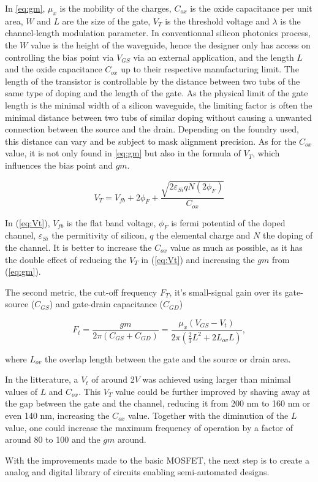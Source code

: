In \ref{eq:gm}, $\mu_x$ is the mobility of the charges, $C_{ox}$ is the oxide capacitance per unit area, $W$ and $L$ are the size of the gate, $V_T$ is the threshold voltage and $\lambda$ is the channel-length modulation parameter. 
In  conventionnal silicon photonics process, the $W$ value is the height of the waveguide, hence the designer only has access on controlling the bias point via  $V_{GS}$ via an external application, and the length $L$ and the oxide capacitance $C_{ox}$ up to their respective manufacturing limit.
The length of the transistor is controllable by the distance between two tubs of the same type of doping and the length of the gate.
As the physical limit of the gate length is the minimal width of a silicon waveguide, the limiting factor is often the minimal distance between two tubs of similar doping without causing a unwanted connection between the source and the drain.
Depending on the foundry used, this distance can vary and be subject to mask alignment precision. 
As for the $C_{ox}$ value, it is not only found in \ref{eq:gm} but also in the formula of $V_T$, which influences the bias point and $gm$.

\begin{equation}
\label{eq:Vt}
V_T = V_{fb} + 2\phi_F + \frac{\sqrt{2\varepsilon_{Si} qN(2\phi_F)}}{C_{ox}}
\end{equation}

In (\ref{eq:Vt}), $V_{fb}$ is the flat band voltage,  $\phi_F$ is fermi potential of the doped channel, $\varepsilon_{Si}$ the permitivity of silicon, $q$ the elemental charge and $N$ the doping of the channel.
It is better to increase the $C_{ox}$ value as much as possible, as it has the double effect of reducing the $V_T$ in (\ref{eq:Vt}) and increasing the $gm$ from (\ref{eq:gm}).

The second metric, the cut-off frequency $F_T$, it's small-signal gain over its gate-source ($C_{GS}$) and gate-drain capacitance ($C_{GD}$) %

\begin{equation}
\label{eq:Ft}
F_t = \frac{gm}{2\pi(C_{GS}+C_{GD})} = \frac{\mu_x(V_{GS}-V_t)}{2\pi (\frac{2}{3}L^2+2L_{ov}L)},
\end{equation}

where $L_{ov}$ the overlap length between the gate and the source or drain area.

In the litterature, a $V_t$ of around 2$V$ was achieved using larger than minimal values of $L$ and $C_{ox}$\CitationNeeded. 
This $V_T$ value could be further improved by shaving away at the gap between the gate and the channel, reducing it from 200 nm to 160 nm or even 140 nm, increasing the $C_{ox}$ value. 
Together with the diminution of the $L$ value, one could increase the maximum frequency of operation by a factor of around 80 to 100 and the $gm$ around\CitationNeeded.

With the improvements made to the basic MOSFET, the next step is to create a analog and digital library of circuits enabling semi-automated designs. 





